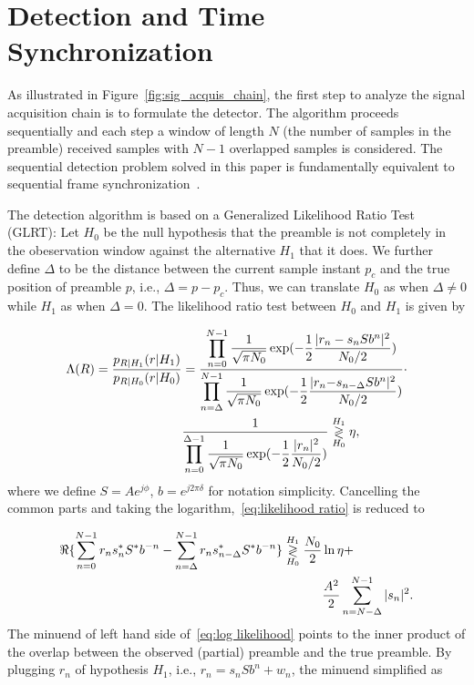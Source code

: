\section{Detection and Time Synchronization}
\label{sec:detection}

As illustrated in Figure~\ref{fig:sig_acquis_chain}, the first step to analyze
the signal acquisition chain is to formulate the detector.
The algorithm proceeds sequentially and each step a window of length $N$ (the number of samples in the preamble) received samples with 
$N-1$ overlapped samples is considered. The sequential detection problem solved 
in this paper is fundamentally equivalent to sequential frame synchronization~\cite{Massey_72,Lui_Tan_86,Scholtz_80}.

The detection algorithm is based on a Generalized Likelihood Ratio Test (GLRT): 
Let $H_0$ be the null hypothesis that the preamble is not completely in the obeservation window against the alternative 
$H_1$ that it does. We further define $\Delta$ to be the distance between the current sample instant $p_c$ and the true position of preamble $p$, 
i.e., $\Delta=p-p_c$. Thus, we can translate $H_0$ as when $\Delta \neq 0$ while $H_1$ as when $\Delta=0$.
The likelihood ratio test between $H_0$ and $H_1$ is given by

\begin{equation}
    \label{eq:likelihood ratio}
    \begin{aligned}
    \Lambda(R)=\frac{p_{R|H_1}(r|H_1)}{p_{R|H_0}(r|H_0)}&= 
    \frac{\displaystyle \prod_{n=0}^{N-1}\frac{1}{\sqrt{\pi N_0}}\exp(-\frac{1}{2}\frac{|r_n-s_nSb^n|^2}{N_0/2})}
    {\displaystyle \prod_{n=\Delta}^{N-1}\frac{1}{\sqrt{\pi N_0}}\exp(-\frac{1}{2}\frac{|r_n{-}s_{n-\Delta}Sb^n|^2}{N_0/2})} \cdot\\
    &\frac{1}{\displaystyle \prod_{n=0}^{\Delta-1}\frac{1}{\sqrt{\pi N_0}}\exp(-\frac{1}{2}\frac{|r_n|^2}{N_0/2})}
    \mathrel{\mathop\gtrless\limits^{H_1}_{H_0}} \eta,
    \end{aligned}
\end{equation}
where we define $S=Ae^{j\phi}$, $b=e^{j2\pi \delta}$ for notation simplicity.
Cancelling the common parts and taking the logarithm,~\eqref{eq:likelihood ratio} is reduced to

\begin{equation}
    \label{eq:log likelihood}
    \begin{aligned}
    \Re\{\sum_{n=0}^{N-1}r_ns^*_nS^*b^{-n}-
    \sum_{n=\Delta}^{N-1}r_ns^*_{n-\Delta}S^*b^{-n}\}
    \mathrel{\mathop\gtrless\limits^{H_1}_{H_0}} \frac{N_0}{2}&\ln\eta+ \\
    &\frac{A^2}{2}\sum_{n=N-\Delta}^{N-1}|s_n|^2.
    \end{aligned}
\end{equation}
The minuend of left hand side of~\eqref{eq:log likelihood} points to the inner product of the overlap between
the observed (partial) preamble and the true preamble. 
By plugging $r_n$ of hypothesis $H_1$, i.e., $r_n=s_nSb^n+w_n$, the minuend simplified as

